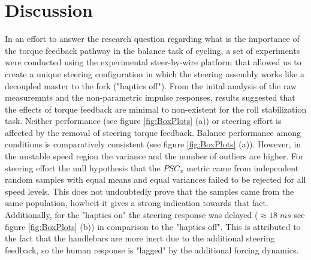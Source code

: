\chapter{Discussion}

In an effort to answer the research question regarding what is the importance of the torque feedback pathway in the balance task of cycling, a set of experiments were conducted using the experimental steer-by-wire platform that allowed us to create a unique steering configuration in which the steering assembly works like a decoupled master to the fork ("haptics off"). From the inital analysis of the raw measuremnts and the non-parametric impulse responses, results  suggested  that the effects of torque feedback are minimal to non-existent for the roll stabilization task. Neither performance (see figure \ref{fig:BoxPlots} (a)) or steering effort is affected by the removal of  steering torque feedback. Balance performance among conditions is comparatively consistent  (see figure \ref{fig:BoxPlots} (a)). However, in the unstable speed region the variance and the number of outliers are higher. For steering effort the null hypothesis that the $\mathit{PSC}_x$ metric came from independent random samples with equal means and equal variances failed to be rejected for all speed levels. This does not undoubtedly prove that the samples came from the same population, howbeit it gives a strong indication towards that fact. Additionally, for the "haptics  on"  the steering response was delayed (\(\approx 18\; \si{ms}\) see figure \ref{fig:BoxPlots} (b)) in comparison to the "haptics off". This is attributed to the fact that the handlebars are more inert due to the additional steering feedback, so the human response is "lagged" by the additional forcing dynamics.


